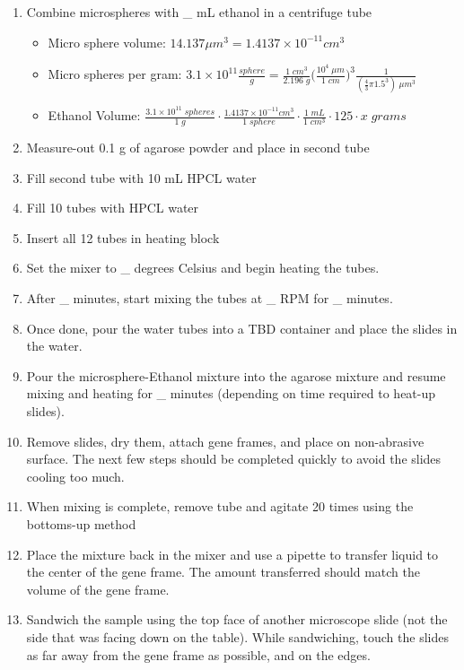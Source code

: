 \begin{enumerate}
    \item Combine microspheres with \_ mL ethanol in a centrifuge tube
        \begin{itemize}
            \item Micro sphere volume: $14.137 \mu m^3 = 1.4137 \times 10^{-11} cm^3$
            \item Micro spheres per gram: $3.1 \times 10^{11} \frac{sphere}{g} = \frac{1 \; cm^3}{2.196 \; g} \big(\frac{10^4 \; \mu m}{1 \; cm} \big)^3 \frac{1}{(\frac{4}{3}\pi 1.5^3) \; \mu m^3}$
            \item Ethanol Volume: $\frac{ 3.1 \times 10^{11} \; spheres}{1 \; g} \cdot \frac{1.4137 \times 10^{-11} cm^3}{1 \; sphere} \cdot \frac{1 \; mL}{1 \; cm^3} \cdot 125 \cdot x \; grams$
        \end{itemize}
        \item Measure-out 0.1 g of agarose powder and place in second tube
        \item Fill second tube with 10 mL HPCL water
        \item Fill 10 tubes with HPCL water
        \item Insert all 12 tubes in heating block
        \item Set the mixer to \_ degrees Celsius and begin heating the tubes.
        \item After \_ minutes, start mixing the tubes at \_ RPM for \_ minutes.
        \item Once done, pour the water tubes into a TBD container and place the slides in the water.
        \item Pour the microsphere-Ethanol mixture into the agarose mixture and resume mixing and heating for \_ minutes (depending on time required to heat-up slides).
        \item Remove slides, dry them, attach gene frames, and place on non-abrasive surface. The next few steps should be completed quickly to avoid the slides cooling too much.
        \item When mixing is complete, remove tube and agitate 20 times using the bottoms-up method
        \item Place the mixture back in the mixer and use a pipette to transfer liquid to the center of the gene frame. The amount transferred should match the volume of the gene frame.
        \item Sandwich the sample using the top face of another microscope slide (not the side that was facing down on the table). While sandwiching, touch the slides as far away from the gene frame as possible, and on the edges.

\end{enumerate}
